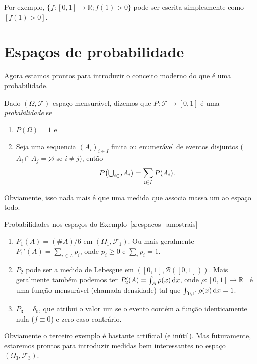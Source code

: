 \documentclass[../main/Notas_de_aula.tex]{subfiles}
\begin{document}
Por exemplo, $\{f:[0,1] \to \mathbb{R}; f(1) > 0\}$ pode ser escrita simplesmente como $[f(1) > 0]$.

\section{Espaços de probabilidade}

Agora estamos prontos para introduzir o conceito moderno do que é uma probabilidade.

\begin{definition}
  Dado $(\Omega, \mathcal{F})$ espaço mensurável, dizemos que $P:\mathcal{F} \to [0,1]$ é uma \emph{probabilidade}  se
  \begin{enumerate}[\quad a)]
  \item $P(\Omega) = 1$ e
  \item Seja uma sequencia $(A_i)_{i\in I}$ finita ou enumerável de eventos disjuntos ($A_i \cap A_j = \varnothing$ se $i \neq j$), então
    \begin{equation}
      P\big({\operatorname*{{\textstyle \bigcup}}\nolimits_{i\in I}} A_i\big) = \sum_{i\in I} P(A_i).
    \end{equation}
  \end{enumerate}
\end{definition}

Obviamente, isso nada mais é que uma medida que associa massa um ao espaço todo.

\begin{example} Probabilidades nos espaços do Exemplo~\ref{x:espacos_amostrais}
  \begin{enumerate}[\quad a)]
  \item $P_1(A) = (\#A)/6$ em $(\Omega_1, \mathcal{F}_1)$.
    Ou mais geralmente $P_1'(A) = \sum_{i \in A} p_i$, onde $p_i \geq 0$ e $\sum_i p_i = 1$.
  \item $P_2$ pode ser a medida de Lebesgue em $([0,1], \mathcal{B}([0,1]))$.
    Mais geralmente também podemos ter $P_2'(A) = \int_A \rho(x) \mathop{}\!\mathrm{d} x$, onde $\rho:[0,1] \to \mathbb{R}_+$ é uma função mensurável (chamada densidade) tal que $\int_{[0,1]} \rho (x) \mathop{}\!\mathrm{d} x = 1$.
  \item $P_3 = \delta_{0}$, que atribui o valor um se o evento contém a função identicamente nula ($f \equiv 0$) e zero caso contrário.
  \end{enumerate}
\end{example}
Obviamente o terceiro exemplo é bastante artificial (e inútil).
Mas futuramente, estaremos prontos para introduzir medidas bem interessantes no espaço $(\Omega_3, \mathcal{F}_3)$.
\end{document}
